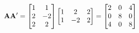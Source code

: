 \begin{enumerate}[font=\bfseries]
\begin{enumerate}
            \[
                \bold{A}\bold{A}^\prime
                =
                \begin{bmatrix}
                    1 & 1 \\
                    2 & -2 \\
                    2 & 2
                \end{bmatrix}
                \begin{bmatrix}
                    1 & 2 & 2 \\
                    1 & -2 & 2
                \end{bmatrix}
                =
                \begin{bmatrix}
                    2 & 0 & 4 \\
                    0 & 8 & 0 \\
                    4 & 0 & 8
                \end{bmatrix}
            \]
            

\end{enumerate}
\end{enumerate}
